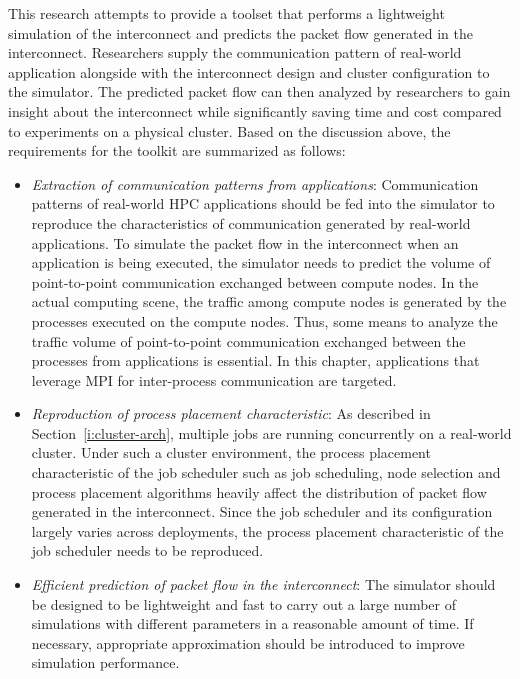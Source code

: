 This research attempts to provide a toolset that performs a lightweight
simulation of the interconnect and predicts the packet flow generated in the
interconnect. Researchers supply the communication pattern of real-world
application alongside with the interconnect design and cluster configuration
to the simulator. The predicted packet flow can then analyzed by researchers
to gain insight about the interconnect while significantly saving time and
cost compared to experiments on a physical cluster. Based on the discussion
above, the requirements for the toolkit are summarized as follows:

\begin{itemize}
\item
  \emph{Extraction of communication patterns from applications}:
  Communication patterns of real-world HPC applications should be fed
  into the simulator to reproduce the characteristics of communication
  generated by real-world applications. To simulate the packet flow in
  the interconnect when an application is being executed, the simulator
  needs to predict the volume of point-to-point communication exchanged
  between compute nodes. In the actual computing scene, the traffic
  among compute nodes is generated by the processes executed on the
  compute nodes. Thus, some means to analyze the traffic volume of
  point-to-point communication exchanged between the processes from
  applications is essential. In this chapter, applications that leverage
  MPI for inter-process communication are targeted.
\item
  \emph{Reproduction of process placement characteristic}:
  As described in Section~\ref{i:cluster-arch}, multiple jobs are running
  concurrently on a real-world cluster. Under such a cluster environment, the
  process placement characteristic of the job scheduler such as job
  scheduling, node selection and process placement algorithms heavily affect
  the distribution of packet flow generated in the interconnect. Since the
  job scheduler and its configuration largely varies across deployments,
  the process placement characteristic of the job scheduler needs to be
  reproduced.
\item
  \emph{Efficient prediction of packet flow in the interconnect}:
  The simulator should be designed to be lightweight and fast
  to carry out a large number of simulations with different parameters in
  a reasonable amount of time. If necessary, appropriate approximation
  should be introduced to improve simulation performance.
\end{itemize}

